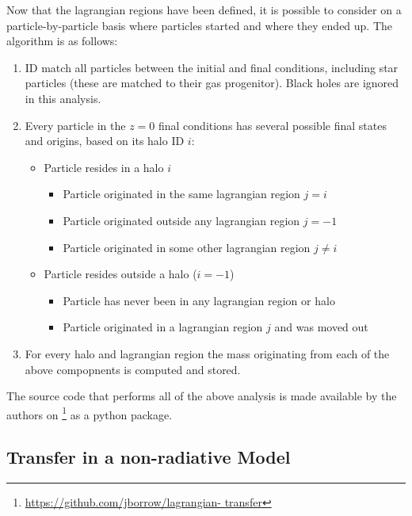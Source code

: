 Now that the lagrangian regions have been defined, it is possible to consider on
a particle-by-particle basis where particles started and where they ended up.
The algorithm is as follows:
\begin{enumerate}
	\item ID match all particles between the initial and final conditions, including
	      star particles (these are matched to their gas progenitor). Black holes
	      are ignored in this analysis.

	\item Every particle in the $z=0$ final conditions has several possible final
	      states and origins, based on its halo ID $i$:
	      \begin{itemize}
	            \item Particle resides in a halo $i$
	            \begin{itemize}
	           		\item Particle originated in the same lagrangian region $j = i$
	           		\item Particle originated outside any lagrangian region $j = -1$
	           		\item Particle originated in some other lagrangian region $j \neq i$
	            \end{itemize}
	            \item Particle resides outside a halo ($i = -1$)
	            \begin{itemize}
	            	\item Particle has never been in any lagrangian region or halo
	            	\item Particle originated in a lagrangian region $j$ and was moved out
	            \end{itemize}
	      \end{itemize}
	      
	\item For every halo and lagrangian region the mass originating from each
	      of the above compopnents is computed and stored.
\end{enumerate}

The source code that performs all of the above analysis is made available by
the authors on \github{}\footnote{\url{https://github.com/jborrow/lagrangian-
transfer}} as a python package.

\subsection{Transfer in a non-radiative Model}

